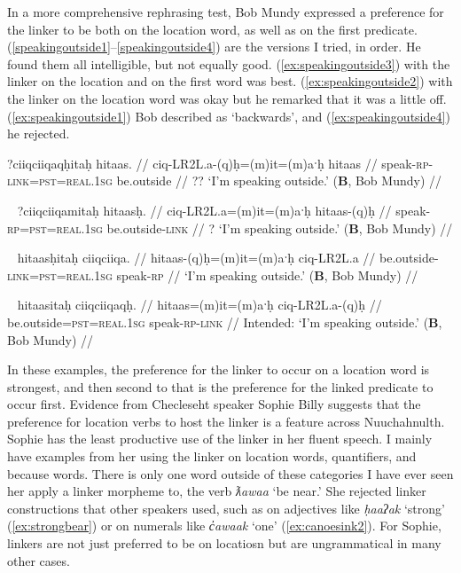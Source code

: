 In a more comprehensive rephrasing test, Bob Mundy expressed a preference for the linker to be both on the location word, as well as on the first predicate. (\ref{speakingoutside1}--\ref{speakingoutside4}) are the versions I tried, in order. He found them all intelligible, but not equally good. (\ref{ex:speakingoutside3}) with the linker on the location and on the first word was best. (\ref{ex:speakingoutside2}) with the linker on the location word was okay but he remarked that it was a little off. (\ref{ex:speakingoutside1}) Bob described as `backwards', and (\ref{ex:speakingoutside4}) he rejected.

\ex \label{ex:speakingoutside1}
\begingl
\glpreamble *?ciiqciiqaqḥitaḥ hitaas. //
\gla ciq-LR2L.a-(q)ḥ=(m)it=(m)aˑḥ hitaas //
\glb speak-\textsc{rp}-\textsc{link}=\textsc{pst}=\textsc{real.1sg} be.outside //
\glft ?? `I'm speaking outside.' (\textbf{B}, Bob Mundy) //
\endgl
\xe

\ex~ \label{ex:speakingoutside2}
\begingl
\glpreamble ?ciiqciiqamitaḥ hitaasḥ. //
\gla ciq-LR2L.a=(m)it=(m)aˑḥ hitaas-(q)ḥ //
\glb speak-\textsc{rp}=\textsc{pst}=\textsc{real.1sg} be.outside-\textsc{link} //
\glft ? `I'm speaking outside.' (\textbf{B}, Bob Mundy) //
\endgl
\xe

\ex~ \label{ex:speakingoutside3}
\begingl
\glpreamble hitaasḥitaḥ ciiqciiqa. //
\gla hitaas-(q)ḥ=(m)it=(m)aˑḥ ciq-LR2L.a //
\glb be.outside-\textsc{link}=\textsc{pst}=\textsc{real.1sg} speak-\textsc{rp} //
\glft `I'm speaking outside.' (\textbf{B}, Bob Mundy) //
\endgl
\xe

\ex~ \label{ex:speakingoutside3}
\begingl
\glpreamble *hitaasitaḥ ciiqciiqaqḥ. //
\gla hitaas=(m)it=(m)aˑḥ ciq-LR2L.a-(q)ḥ //
\glb be.outside=\textsc{pst}=\textsc{real.1sg} speak-\textsc{rp}-\textsc{link} //
\glft Intended: `I'm speaking outside.' (\textbf{B}, Bob Mundy) //
\endgl
\xe

In these examples, the preference for the linker to occur on a location word is strongest, and then second to that is the preference for the linked predicate to occur first. Evidence from Checleseht speaker Sophie Billy suggests that the preference for location verbs to host the linker is a feature across Nuuchahnulth. Sophie has the least productive use of the linker in her fluent speech. I mainly have examples from her using the linker on location words, quantifiers, and because words. There is only one word outside of these categories I have ever seen her apply a linker morpheme to, the verb \textit{ƛawaa} `be near.' She rejected linker constructions that other speakers used, such as on adjectives like \textit{ḥaaʔak} `strong' (\ref{ex:strongbear}) or on numerals like \textit{c̓awaak} `one' (\ref{ex:canoesink2}). For Sophie, linkers are not just preferred to be on locatiosn but are ungrammatical in many other cases.

